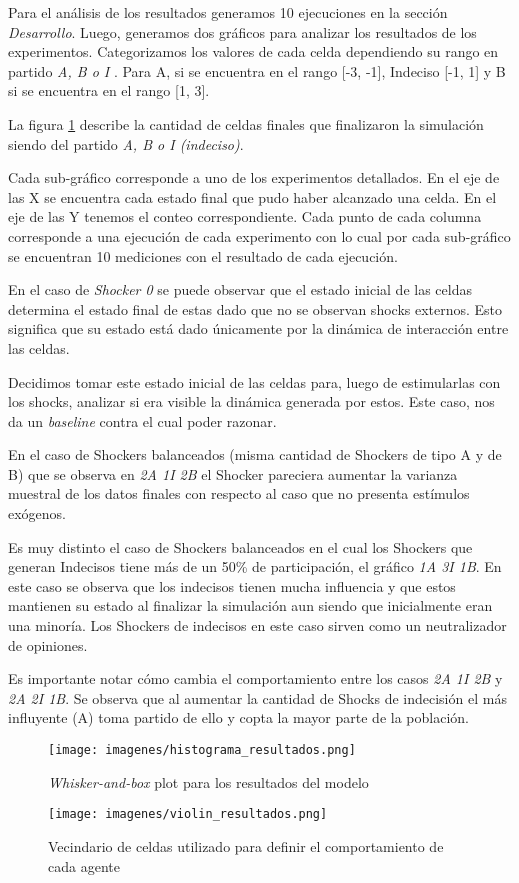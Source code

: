 Para el análisis de los resultados generamos 10 ejecuciones 
en la sección \textit{Desarrollo}.
Luego, generamos dos gráficos para analizar los resultados de los experimentos.
Categorizamos los valores de cada celda dependiendo su rango en partido
\textit{A, B o I }. Para A, si se encuentra en el rango [-3, -1], Indeciso [-1, 1]  y B si se encuentra en el rango [1, 3].

La figura \ref{fig:modelo_shock_box} describe la cantidad de celdas finales que
finalizaron la simulación siendo del partido \textit{A, B o I (indeciso)}.

Cada sub-gráfico corresponde a uno de los experimentos detallados. En el eje de
las X se encuentra cada estado final que pudo haber alcanzado una celda. En el
eje de las Y tenemos el conteo correspondiente.  Cada punto de cada columna
corresponde a una ejecución de cada experimento con lo cual por cada
sub-gráfico se encuentran 10 mediciones con el resultado de cada ejecución.


En el caso de \textit{Shocker 0} se puede observar que el estado inicial de las
celdas determina el estado final de estas dado que no se observan shocks
externos. Esto significa que su estado está dado únicamente por la dinámica de
interacción entre las celdas.

Decidimos tomar este estado inicial de las celdas para, luego de estimularlas
con los shocks, analizar si era visible la dinámica generada por estos.
Este caso, nos da un \textit{baseline} contra el cual poder razonar.

En el caso de Shockers balanceados (misma cantidad de Shockers de tipo A  y de
B) que se observa en \textit{2A 1I 2B} el Shocker
pareciera aumentar la varianza muestral de los datos finales con respecto al
caso que no presenta estímulos exógenos.

Es muy distinto el caso de Shockers balanceados en el cual los Shockers que generan
Indecisos tiene más de un 50\% de participación, el gráfico \textit{1A 3I 1B}.
En este caso se observa que los indecisos tienen mucha influencia y que estos
mantienen su estado al finalizar la simulación aun siendo que inicialmente eran una minoría.
Los Shockers de indecisos en este caso sirven como un neutralizador de opiniones.

Es importante notar cómo cambia el comportamiento entre los casos \textit{2A 1I 2B} y \textit{2A 2I 1B}. Se observa que al aumentar la cantidad de Shocks de indecisión el más influyente (A) toma partido de ello y copta la mayor parte de la población.



\begin{figure}[!h]
\centering
\texttt{[image: imagenes/histograma\_resultados.png]}
    \caption{\textit{Whisker-and-box} plot para los resultados del modelo}
\label{fig:modelo_shock_box}
\end{figure}

\begin{figure}[!h]
\centering
\texttt{[image: imagenes/violin\_resultados.png]}
\caption{Vecindario de celdas utilizado para definir el comportamiento de cada agente}
\label{fig:modelo_shock_violin}
\end{figure}


